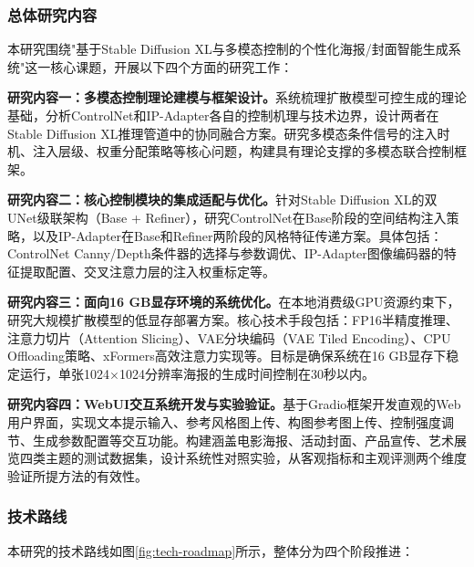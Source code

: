 \documentclass[12pt,a4paper]{ctexart}
\newcommand{\sdxl}{Stable Diffusion XL}
\newcommand{\controlnet}{ControlNet}
\newcommand{\ipadapter}{IP-Adapter}
\begin{document}
\subsubsection{总体研究内容}

本研究围绕"基于\sdxl{}与多模态控制的个性化海报/封面智能生成系统"这一核心课题，开展以下四个方面的研究工作：

\textbf{研究内容一：多模态控制理论建模与框架设计。}系统梳理扩散模型可控生成的理论基础，分析\controlnet{}和\ipadapter{}各自的控制机理与技术边界，设计两者在\sdxl{}推理管道中的协同融合方案。研究多模态条件信号的注入时机、注入层级、权重分配策略等核心问题，构建具有理论支撑的多模态联合控制框架。

\textbf{研究内容二：核心控制模块的集成适配与优化。}针对\sdxl{}的双UNet级联架构（Base + Refiner），研究\controlnet{}在Base阶段的空间结构注入策略，以及\ipadapter{}在Base和Refiner两阶段的风格特征传递方案。具体包括：ControlNet Canny/Depth条件器的选择与参数调优、IP-Adapter图像编码器的特征提取配置、交叉注意力层的注入权重标定等。

\textbf{研究内容三：面向16 GB显存环境的系统优化。}在本地消费级GPU资源约束下，研究大规模扩散模型的低显存部署方案。核心技术手段包括：FP16半精度推理、注意力切片（Attention Slicing）、VAE分块编码（VAE Tiled Encoding）、CPU Offloading策略、xFormers高效注意力实现等。目标是确保系统在16 GB显存下稳定运行，单张1024$\times$1024分辨率海报的生成时间控制在30秒以内。

\textbf{研究内容四：WebUI交互系统开发与实验验证。}基于Gradio框架开发直观的Web用户界面，实现文本提示输入、参考风格图上传、构图参考图上传、控制强度调节、生成参数配置等交互功能。构建涵盖电影海报、活动封面、产品宣传、艺术展览四类主题的测试数据集，设计系统性对照实验，从客观指标和主观评测两个维度验证所提方法的有效性。

\subsubsection{技术路线}

本研究的技术路线如图\ref{fig:tech-roadmap}所示，整体分为四个阶段推进：
\end{document}
